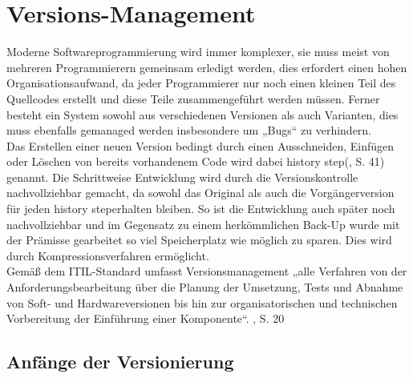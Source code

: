 \chapter{Versions-Management}

Moderne Softwareprogrammierung wird immer komplexer, sie muss meist von mehreren Programmierern gemeinsam erledigt werden, dies erfordert einen hohen Organisationsaufwand, da jeder Programmierer nur noch einen kleinen Teil des Quellcodes erstellt und diese Teile zusammengeführt werden müssen. Ferner besteht ein System sowohl aus verschiedenen Versionen als auch Varianten, dies muss ebenfalls gemanaged werden insbesondere um „Bugs“ zu verhindern.
\\
Das Erstellen einer neuen Version bedingt durch einen Ausschneiden, Einfügen oder Löschen von bereits vorhandenem Code wird dabei \Gu history step\Go (\cite{cm_vc}, S. 41) genannt. 
Die Schrittweise Entwicklung wird durch die Versionskontrolle nachvollziehbar gemacht, da sowohl das Original als auch die Vorgängerversion für jeden \Gu history step\Go erhalten bleiben. So ist die Entwicklung auch später noch nachvollziehbar und im Gegensatz zu einem herkömmlichen Back-Up wurde mit der Prämisse gearbeitet so viel Speicherplatz wie möglich zu sparen. Dies wird durch Kompressionsverfahren ermöglicht.
\\
Gemäß dem ITIL-Standard umfasst Versionsmanagement „alle Verfahren von der Anforderungsbearbeitung über die Planung der Umsetzung, Tests und Abnahme von Soft- und Hardwareversionen bis hin zur organisatorischen und technischen Vorbereitung der Einführung einer Komponente“. \cite{itil_infosec}, S. 20

\section{Anfänge der Versionierung}

